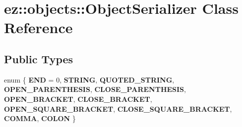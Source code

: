 \hypertarget{classez_1_1objects_1_1ObjectSerializer}{}\section{ez\+:\+:objects\+:\+:Object\+Serializer Class Reference}
\label{classez_1_1objects_1_1ObjectSerializer}
\subsection*{Public Types}
\begin{DoxyCompactItemize}
\item 
enum \{ \newline
{\bfseries E\+ND} = 0, 
{\bfseries S\+T\+R\+I\+NG}, 
{\bfseries Q\+U\+O\+T\+E\+D\+\_\+\+S\+T\+R\+I\+NG}, 
{\bfseries O\+P\+E\+N\+\_\+\+P\+A\+R\+E\+N\+T\+H\+E\+S\+IS}, 
\newline
{\bfseries C\+L\+O\+S\+E\+\_\+\+P\+A\+R\+E\+N\+T\+H\+E\+S\+IS}, 
{\bfseries O\+P\+E\+N\+\_\+\+B\+R\+A\+C\+K\+ET}, 
{\bfseries C\+L\+O\+S\+E\+\_\+\+B\+R\+A\+C\+K\+ET}, 
{\bfseries O\+P\+E\+N\+\_\+\+S\+Q\+U\+A\+R\+E\+\_\+\+B\+R\+A\+C\+K\+ET}, 
\newline
{\bfseries C\+L\+O\+S\+E\+\_\+\+S\+Q\+U\+A\+R\+E\+\_\+\+B\+R\+A\+C\+K\+ET}, 
{\bfseries C\+O\+M\+MA}, 
{\bfseries C\+O\+L\+ON}
 \}
\end{DoxyCompactItemize}
